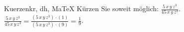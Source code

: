 \begin{MAufgabe}{Kuerzen}{kr, dh, MaTeX}
K\"urzen Sie soweit m\"oglich: $\frac{5\, x\, y\, z^3}{45\, x\, y\, z^3}$.\\ 
\ifLsg\MLoesung
\quad $\frac{5\, x\, y\, z^3}{45\, x\, y\, z^3}=\frac{(5\, x\, y\, z^3)\cdot(1)}{(5\, x\, y\, z^3)\cdot(9)}=\frac{1}{9}$.\else\relax\fi
 \end{MAufgabe}